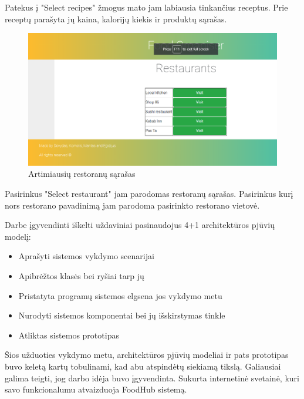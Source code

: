 \documentclass{VUMIFInfKursinis}
\begin{document}
Patekus į "Select recipes" žmogus mato jam labiausia tinkančius receptus. Prie receptų parašyta jų kaina, kalorijų kiekis ir produktų sąrašas.

\begin{figure}[H]
    \centering
 \includegraphics[scale=0.5]{img/restaurants}
    \caption{Artimiausių restoranų sąrašas}   %
    \label{img:mlp}
\end{figure}
\bigskip

Pasirinkus "Select restaurant" jam parodomas restoranų sąrašas. Pasirinkus kurį nors restorano pavadinimą jam parodoma pasirinkto restorano vietovė. 

Darbe įgyvendinti iškelti uždaviniai pasinaudojus 4+1 architektūros pjūvių modelį:
\begin{small}
\begin{itemize}[noitemsep,topsep=0pt]
\setlength\itemsep{0em}
\item {Aprašyti sistemos vykdymo scenarijai}
\item {Apibrėžtos klasės bei ryšiai tarp jų}
\item{Pristatyta programų sistemos elgsena jos vykdymo metu}
\item {Nurodyti sistemos komponentai bei jų išskirstymas tinkle}
\item{Atliktas sistemos prototipas}
\end{itemize}

\end{small}
\bigskip
Šios užduoties vykdymo metu, architektūros pjūvių modeliai ir pats prototipas buvo keletą kartų tobulinami, kad abu atspindėtų siekiamą tikslą. Galiausiai galima teigti, jog darbo idėja buvo įgyvendinta. Sukurta internetinė svetainė, kuri savo funkcionalumu atvaizduoja FoodHub sistemą.

\printbibliography[heading=bibintoc] %

\appendix  %
\end{document}
